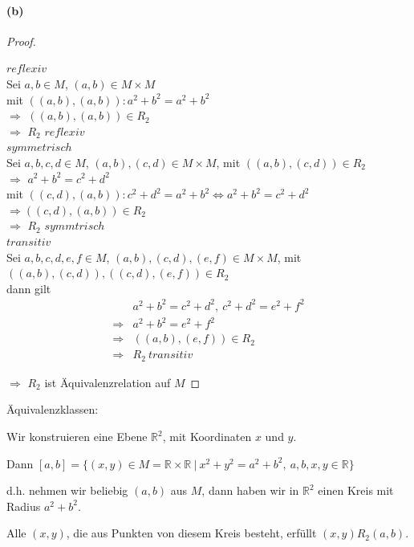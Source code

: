\paragraph{(b)}
\begin{proof}
$ $\newline

$reflexiv$\\
Sei $a,b\in M$, $(a,b)\in M\times M$\\
mit $((a,b),(a,b)):a^2+b^2=a^2+b^2$\\
$\Rightarrow$ $((a,b),(a,b))\in R_2$\\
$\Rightarrow$ $R_2$ $reflexiv$\\

$symmetrisch$\\
Sei $a,b,c,d\in M$, $(a,b),(c,d)\in M\times M$, mit $((a,b),(c,d))\in R_2$\\
$\Rightarrow$ $a^2+b^2=c^2+d^2$\\
mit $((c,d),(a,b)):c^2+d^2=a^2+b^2\Leftrightarrow a^2+b^2=c^2+d^2$\\
$\Rightarrow ((c,d),(a,b))\in R_2$\\
$\Rightarrow$ $R_2$ $symmtrisch$\\

$transitiv$\\
Sei $a,b,c,d,e,f\in M$, $(a,b),(c,d),(e,f)\in M\times M$, mit $((a,b),(c,d)),((c,d),(e,f))\in R_2$\\
dann gilt
\begin{align*}
&a^2+b^2=c^2+d^2,\ c^2+d^2=e^2+f^2\\
\Rightarrow &a^2+b^2=e^2+f^2\\
\Rightarrow &((a,b),(e,f))\in R_2\\
\Rightarrow &R_2\ transitiv
\end{align*}

$\Rightarrow$ $R_2$ ist Äquivalenzrelation auf $M$
\end{proof}

Äquivalenzklassen:

Wir konstruieren eine Ebene $\mathbb{R}^2$, mit Koordinaten $x$ und $y$.

Dann $[a,b]=\{(x,y)\in M=\mathbb{R}\times\mathbb{R}\ |\ x^2+y^2=a^2+b^2,\ a,b,x,y\in\mathbb{R}\}$

d.h. nehmen wir beliebig $(a,b)$ aus $M$, dann haben wir in $\mathbb{R}^2$ einen Kreis mit Radius $a^2+b^2$.

Alle $(x,y)$, die aus Punkten von diesem Kreis besteht, erfüllt $(x,y)R_2(a,b)$.

